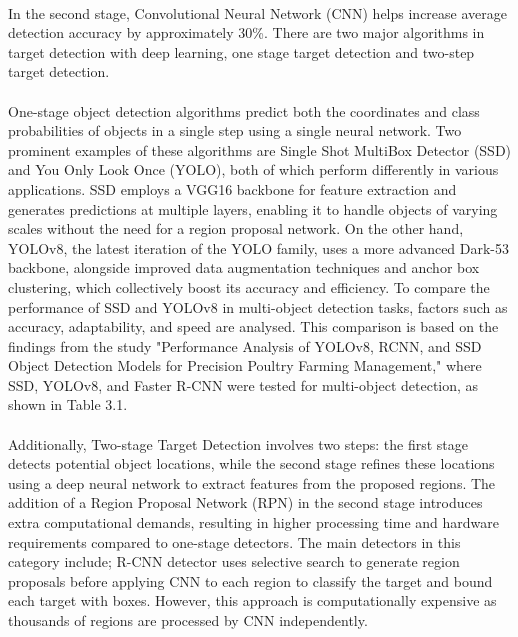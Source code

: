 \paragraph*{}
In the second stage, Convolutional Neural Network (CNN) helps increase average detection accuracy by approximately 30\%\cite{zhou2023review}. There are two major algorithms in target detection with deep learning, one stage target detection and two-step target detection. 

\paragraph*{}
One-stage object detection algorithms predict both the coordinates and class probabilities of objects in a single step using a single neural network\cite{karbouj2024comparative}. Two prominent examples of these algorithms are Single Shot MultiBox Detector (SSD) and You Only Look Once (YOLO), both of which perform differently in various applications. SSD employs a VGG16 backbone for feature extraction and generates predictions at multiple layers, enabling it to handle objects of varying scales without the need for a region proposal network\cite{liu2016ssd}. On the other hand, YOLOv8, the latest iteration of the YOLO family, uses a more advanced Dark-53 backbone, alongside improved data augmentation techniques and anchor box clustering, which collectively boost its accuracy and efficiency\cite{zhou2023review}. To compare the performance of SSD and YOLOv8 in multi-object detection tasks, factors such as accuracy, adaptability, and speed are analysed. This comparison is based on the findings from the study "Performance Analysis of YOLOv8, RCNN, and SSD Object Detection Models for Precision Poultry Farming Management," where SSD, YOLOv8, and Faster R-CNN were tested for multi-object detection, as shown in Table 3.1. 

\paragraph*{}
Additionally, Two-stage Target Detection involves two steps: the first stage detects potential object locations, while the second stage refines these locations using a deep neural network to extract features from the proposed regions\cite{karbouj2024comparative}. The addition of a Region Proposal Network (RPN) in the second stage introduces extra computational demands, resulting in higher processing time and hardware requirements compared to one-stage detectors\cite{lin2017feature}. The main detectors in this category include;  R-CNN detector uses selective search to generate region proposals before applying CNN to each region to classify the target and bound each target with boxes. However, this approach is computationally  expensive as thousands of regions are processed by CNN independently\cite{girshick2014rich}.

